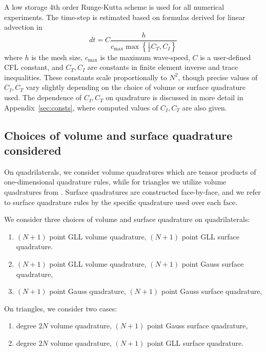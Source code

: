 \documentclass{svjour3}                     %
\newcommand{\LRc}[1]{\left\{ #1 \right\}}
\begin{document}
A low storage 4th order Runge-Kutta scheme \cite{carpenter1994fourth} is used for all numerical experiments.  The time-step is estimated based on formulas derived for linear advection in \cite{chan2015gpu, chan2018multi}
\[
dt = C \frac{h}{c_{\max} \max\LRc{\frac{1}{2}C_T, C_I}}
\]
where $h$ is the mesh size, $c_{\max}$ is the maximum wave-speed, $C$ is a user-defined CFL constant, and $C_T, C_I$ are constants in finite element inverse and trace inequalities.  These constants scale proportionally to $N^2$, though precise values of $C_I, C_T$ vary slightly depending on the choice of volume or surface quadrature used.  The dependence of $C_I, C_T$ on quadrature is discussed in more detail in Appendix~\ref{sec:consts}, where computed values of $C_I, C_T$ are also given.

\subsection{Choices of volume and surface quadrature considered}
\label{sec:opts}

On quadrilaterals, we consider volume quadratures which are tensor products of one-dimensional quadrature rules, while for triangles we utilize volume quadratures from \cite{xiao2010quadrature}.  Surface quadratures are constructed face-by-face, and we refer to surface quadrature rules by the specific quadrature used over each face.  

We consider three choices of volume and surface quadrature on quadrilaterals: 
\begin{enumerate}
\item $(N+1)$ point GLL volume quadrature, $(N+1)$ point GLL surface quadrature.
\item $(N+1)$ point GLL volume quadrature, $(N+1)$ point Gauss surface quadrature,
\item $(N+1)$ point Gauss quadrature, $(N+1)$ point Gauss surface quadrature,
\end{enumerate}
On triangles, we consider two cases:
\begin{enumerate}
\item degree $2N$ volume quadrature, $(N+1)$ point Gauss surface quadrature,
\item degree $2N$ volume quadrature, $(N+1)$ point GLL surface quadrature.
\end{enumerate}
\end{document}
